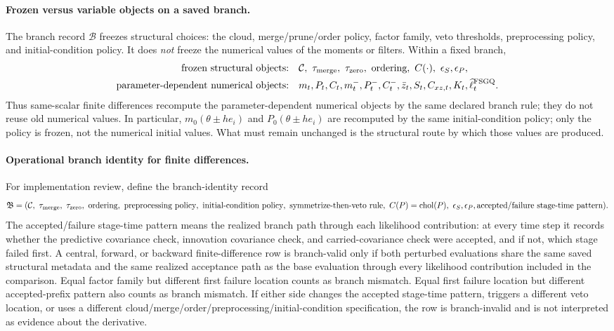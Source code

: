 \documentclass[11pt]{article}
\numberwithin{equation}{section}
\newcommand{\chol}{\operatorname{chol}}
\newcommand{\ellhat}{\widehat\ell}
\begin{document}
\paragraph{Frozen versus variable objects on a saved branch.}
The branch record \(\mathcal B\) freezes structural choices: the cloud,
merge/prune/order policy, factor family, veto thresholds, preprocessing
policy, and initial-condition policy.  It does \emph{not} freeze the numerical
values of the moments or filters.  Within a fixed branch,
\begin{equation}
\begin{aligned}
  \text{frozen structural objects:}
  &\quad \mathcal C,\ \tau_{\rm merge},\ \tau_{\rm zero},\ \text{ordering},
  \ C(\cdot),\ \epsilon_S,\epsilon_P,\\
  \text{parameter-dependent numerical objects:}
  &\quad m_t,P_t,C_t,m_t^-,P_t^-,C_t^-,\bar z_t,S_t,C_{xz,t},K_t,
  \ellhat_t^{\rm FSGQ}.
\end{aligned}
  \label{eq:p32-frozen-vs-variable}
\end{equation}
Thus same-scalar finite differences recompute the parameter-dependent numerical
objects by the same declared branch rule; they do not reuse old numerical
values.  In particular, \(m_0(\theta\pm he_i)\) and \(P_0(\theta\pm he_i)\)
are recomputed by the same initial-condition policy; only the policy is frozen,
not the numerical initial values.  What must remain unchanged is the structural
route by which those values are produced.

\paragraph{Operational branch identity for finite differences.}
For implementation review, define the branch-identity record
\begin{equation}
  \mathfrak B
  =
  (\mathcal C,\ \tau_{\rm merge},\ \tau_{\rm zero},\ \text{ordering},\
   \text{preprocessing policy},\ \text{initial-condition policy},\
   \text{symmetrize-then-veto rule},\ C(P)=\chol(P),\ \epsilon_S,\epsilon_P,
   \text{accepted/failure stage-time pattern}).
  \label{eq:p32-branch-identity-record}
\end{equation}
The accepted/failure stage-time pattern means the realized branch path through
each likelihood contribution: at every time step it records whether the
predictive covariance check, innovation covariance check, and carried-covariance
check were accepted, and if not, which stage failed first.  A central, forward,
or backward finite-difference row is branch-valid only if both perturbed
evaluations share the same saved structural metadata and the same realized
acceptance path as the base evaluation through every likelihood contribution
included in the comparison.  Equal factor family but different first failure
location counts as branch mismatch.  Equal first failure location but different
accepted-prefix pattern also counts as branch mismatch.  If either side changes
the accepted stage-time pattern, triggers a different veto location, or uses a
different cloud/merge/order/preprocessing/initial-condition specification, the
row is branch-invalid and is not interpreted as evidence about the derivative.
\end{document}
